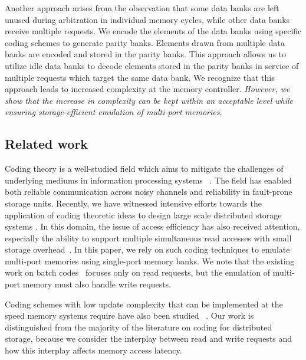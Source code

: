 Another approach arises from the observation that some data banks are left unused during arbitration in individual memory cycles, while other data banks receive multiple requests. We encode the elements of the data banks using specific coding schemes to generate parity banks. Elements drawn from multiple data banks are encoded and stored in the parity banks. This approach allows us to utilize idle data banks to decode elements stored in the parity banks in service of multiple requests which target the same data bank. We recognize that this approach leads to increased complexity at the memory controller. {\em However, we show that the increase in complexity can be kept within an acceptable level while ensuring storage-efficient emulation of multi-port memories.}

\subsection{Related work}

Coding theory is a well-studied field which aims to mitigate the challenges of underlying mediums in information processing systems ~\cite{MacSlo, Cover}. The field has enabled both reliable communication across noisy channels and reliability in fault-prone storage units. Recently, we have witnessed intensive efforts towards the application of coding theoretic ideas to design large scale distributed storage systems \cite{Azure, SAPDVCB13, Rashmi14}. In this domain, the issue of access efficiency has also received attention, especially the ability to support multiple simultaneous read accesses with small storage overhead~\cite{batchcodes, RPDV16, RSDG16, Wang2017}. In this paper, we rely on such coding techniques to emulate multi-port memories using single-port memory banks. We note that the existing work on batch codes~\cite{batchcodes} focuses only on read requests, but the emulation of multi-port memory must also handle write requests. 

Coding schemes with low update complexity that can be implemented at the speed memory systems require have also been studied ~\cite{ASV10, MCW14}. Our work is distinguished from the majority of the literature on coding for distributed storage, because we consider the interplay between read and write requests and how this interplay affects memory access latency.

